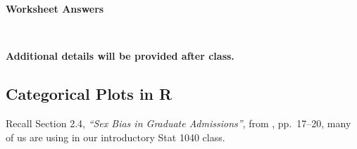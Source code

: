 \documentclass[12pt,letterpaper,final]{article}
\begin{document}


\newpage


\if{}

\centerline{\Large \bf Worksheet Answers}~\\



\newpage




\newpage




\newpage




\else
{\bf Additional details will be provided after class.}
\fi


\newpage


\subsection{Categorical Plots in R}


Recall Section 2.4, {\it ``Sex Bias in Graduate Admissions''},
from \cite{FPP2007}, pp.~17--20, many of us are using in our introductory
Stat 1040 class.
\end{document}
